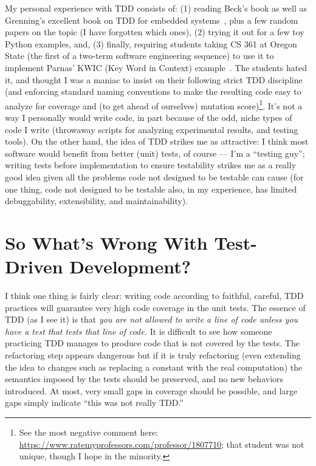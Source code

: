 \documentclass[sigplan,screen]{acmart}
\begin{document}
My personal experience with TDD consists of:  (1) reading Beck's book
as well as
Grenning's excellent book on TDD for embedded systems~\cite{grenning},
plus a few random papers on the topic (I have forgotten which ones),
(2) trying it
out for a few toy Python examples, and, (3) finally, requiring students taking CS 361 at
Oregon State (the first of a two-term software engineering sequence)
to use it to implement Parnas' KWIC (Key Word in Context) example~\cite{parnas1972criteria}.
The students hated it, and thought I was a maniac to insist on their
following strict TDD discipline (and enforcing standard naming conventions
to make the resulting code easy to analyze for coverage and (to get
ahead of ourselves) mutation score)\footnote{See the most negative comment here:
  \url{https://www.ratemyprofessors.com/professor/1807710}; that
  student was not unique, though I hope in the minority.}.  It's not a way I personally
would write code, in part because of the odd, niche types of code I
write (throwaway scripts for analyzing experimental results, and
testing tools).  On the other hand, the idea of TDD strikes me as
attractive:  I think most software would benefit from better (unit)
tests, of course --- I'm a ``testing guy''; writing tests before
implementation to ensure testability strikes me as a really good idea
given all the problems code not designed to be testable can cause (for
one thing, code not designed to be testable also, in my experience,
has limited debuggability, extensibility, and maintainability).


\section{So What's Wrong With Test-Driven Development?}

I think one thing is fairly clear:  writing code according to
faithful, careful, TDD practices will guarantee very high code
coverage in the unit tests.  The essence of TDD (as I see it) is that
\emph{you are not allowed to write a line of code unless you have a
  test that tests that line of code.}  It is difficult to see how
someone practicing TDD manages to produce code that is not covered by
the tests.  The refactoring step appears dangerous but if it is truly
refactoring (even extending the idea to changes such as replacing a
constant with the real computation) the semantics imposed by the tests
should be preserved, and no new behaviors introduced.  At most, very
small gaps in coverage should be possible, and large gaps simply
indicate ``this was not really TDD.''
\end{document}
